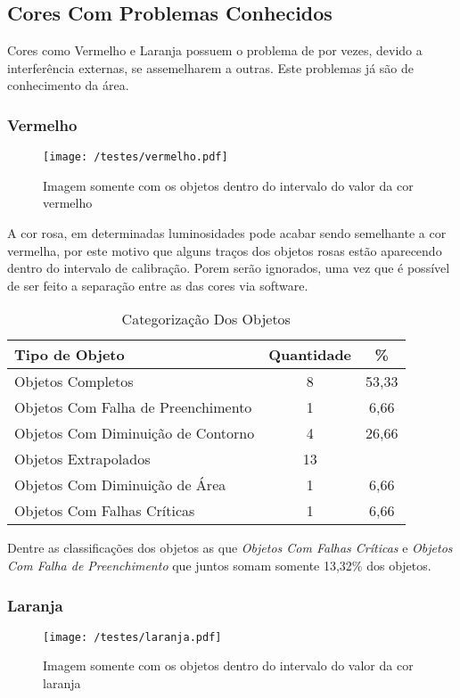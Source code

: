 \subsection{Cores Com Problemas Conhecidos}
Cores como Vermelho e Laranja possuem o problema de por vezes, devido a interferência externas, se assemelharem a outras. Este problemas já são de conhecimento da área.
	
	
\subsubsection{Vermelho}
	\begin{figure}[H]
		\centering
		\texttt{[image: /testes/vermelho.pdf]}
		\caption{Imagem somente com os objetos dentro do intervalo do valor da cor vermelho}
		\label{disposicaoparte}
	\end{figure}

A cor rosa, em determinadas luminosidades pode acabar sendo semelhante a cor vermelha, por este motivo que alguns traços dos objetos rosas estão aparecendo dentro do intervalo de calibração. Porem serão ignorados, uma vez que é possível de ser feito a separação entre as das cores via software.	

	
	\begin{table}[h]
\centering
\begin{tabular}{l|c|c}
Tipo de Objeto & Quantidade  & \% \\ %
\hline                               %
Objetos Completos &  8 & 53,33 \\
\hline 
Objetos Com Falha de Preenchimento & 1 & 6,66 \\
\hline 
Objetos Com Diminuição de Contorno &  4 & 26,66 \\
\hline 
Objetos Extrapolados &  13 \\
\hline 
Objetos Com Diminuição de Área &  1 &6,66 \\
\hline 
Objetos Com Falhas Críticas &  1 & 6,66\\
\hline 
\end{tabular}
\caption{Categorização Dos Objetos}
\end{table}

Dentre as classificações dos objetos as que  \textit{Objetos Com Falhas Críticas} e \textit{Objetos Com Falha de Preenchimento} que juntos somam somente 13,32\% dos objetos.

\subsubsection{Laranja}
	\begin{figure}[H]
		\centering
		\texttt{[image: /testes/laranja.pdf]}
		\caption{Imagem somente com os objetos dentro do intervalo do valor da cor laranja}
		\label{disposicaoparte}
	\end{figure}
	
